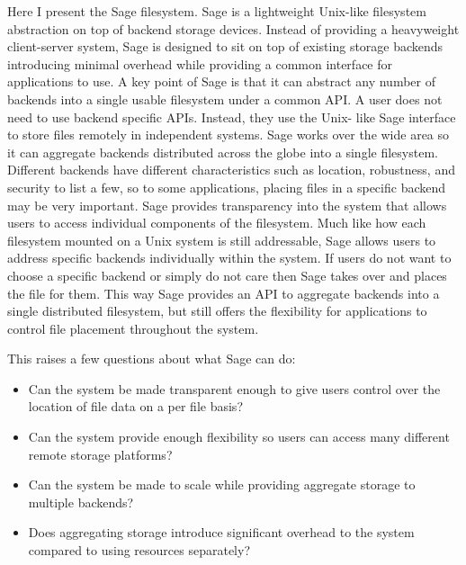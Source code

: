 
Here I present the Sage filesystem. Sage is a lightweight Unix-like filesystem
abstraction on top of backend storage devices. Instead of providing a
heavyweight client-server system, Sage is designed to sit on top of existing
storage backends introducing minimal overhead while providing a common
interface for applications to use. A key point of Sage is that it can abstract
any number of backends into a single usable filesystem under a common API. A
user does not need to use backend specific APIs. Instead, they use the Unix-
like Sage interface to store files remotely in independent systems. Sage works
over the wide area so it can aggregate backends distributed across the globe
into a single filesystem. Different backends have different characteristics
such as location, robustness, and security to list a few, so to some
applications, placing files in a specific backend may be very important. Sage
provides transparency into the system that allows users to access individual
components of the filesystem. Much like how each filesystem mounted on a Unix
system is still addressable, Sage allows users to address specific backends
individually within the system. If users do not want to choose a specific
backend or simply do not care then Sage takes over and places the file for
them. This way Sage provides an API to aggregate backends into a single
distributed filesystem, but still offers the flexibility for applications to
control file placement throughout the system.

This raises a few questions about what Sage can do:
\begin{itemize}
\item Can the system be made transparent enough to give users control over the location of file data on a per file basis?

\item Can the system provide enough flexibility so users can access many different remote storage platforms?

\item Can the system be made to scale while providing aggregate storage to multiple backends?

\item Does aggregating storage introduce significant overhead to the system compared to using resources separately?
\end{itemize}


